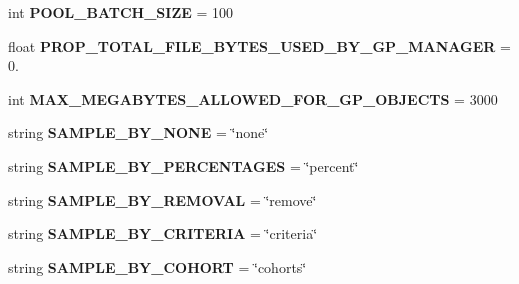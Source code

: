 \begin{DoxyCompactItemize}
\item 
int {\bfseries P\+O\+O\+L\+\_\+\+B\+A\+T\+C\+H\+\_\+\+S\+I\+ZE} = 100\hypertarget{namespacenegui_1_1pgdriveneestimator_aadadcf84aaf075e62f2a0720ef29ea11}{}\label{namespacenegui_1_1pgdriveneestimator_aadadcf84aaf075e62f2a0720ef29ea11}

\item 
float {\bfseries P\+R\+O\+P\+\_\+\+T\+O\+T\+A\+L\+\_\+\+F\+I\+L\+E\+\_\+\+B\+Y\+T\+E\+S\+\_\+\+U\+S\+E\+D\+\_\+\+B\+Y\+\_\+\+G\+P\+\_\+\+M\+A\+N\+A\+G\+ER} = 0.\hypertarget{namespacenegui_1_1pgdriveneestimator_a89e1e433a1e13de143a0ba9eb5f67c4e}{}\label{namespacenegui_1_1pgdriveneestimator_a89e1e433a1e13de143a0ba9eb5f67c4e}

\item 
int {\bfseries M\+A\+X\+\_\+\+M\+E\+G\+A\+B\+Y\+T\+E\+S\+\_\+\+A\+L\+L\+O\+W\+E\+D\+\_\+\+F\+O\+R\+\_\+\+G\+P\+\_\+\+O\+B\+J\+E\+C\+TS} = 3000\hypertarget{namespacenegui_1_1pgdriveneestimator_ad3cf3c0a3d4e6985fa514fd4a5f31462}{}\label{namespacenegui_1_1pgdriveneestimator_ad3cf3c0a3d4e6985fa514fd4a5f31462}

\item 
string {\bfseries S\+A\+M\+P\+L\+E\+\_\+\+B\+Y\+\_\+\+N\+O\+NE} = \char`\"{}none\char`\"{}\hypertarget{namespacenegui_1_1pgdriveneestimator_a4907a8a6c190c39d4a349740c1ba54e5}{}\label{namespacenegui_1_1pgdriveneestimator_a4907a8a6c190c39d4a349740c1ba54e5}

\item 
string {\bfseries S\+A\+M\+P\+L\+E\+\_\+\+B\+Y\+\_\+\+P\+E\+R\+C\+E\+N\+T\+A\+G\+ES} = \char`\"{}percent\char`\"{}\hypertarget{namespacenegui_1_1pgdriveneestimator_ad560d78f911e3ffb994db493a2ab89b2}{}\label{namespacenegui_1_1pgdriveneestimator_ad560d78f911e3ffb994db493a2ab89b2}

\item 
string {\bfseries S\+A\+M\+P\+L\+E\+\_\+\+B\+Y\+\_\+\+R\+E\+M\+O\+V\+AL} = \char`\"{}remove\char`\"{}\hypertarget{namespacenegui_1_1pgdriveneestimator_a3fa91319aa849a007dd7cfd4e22213f9}{}\label{namespacenegui_1_1pgdriveneestimator_a3fa91319aa849a007dd7cfd4e22213f9}

\item 
string {\bfseries S\+A\+M\+P\+L\+E\+\_\+\+B\+Y\+\_\+\+C\+R\+I\+T\+E\+R\+IA} = \char`\"{}criteria\char`\"{}\hypertarget{namespacenegui_1_1pgdriveneestimator_a3732dae3a6f631c08a94fd98ca308e84}{}\label{namespacenegui_1_1pgdriveneestimator_a3732dae3a6f631c08a94fd98ca308e84}

\item 
string {\bfseries S\+A\+M\+P\+L\+E\+\_\+\+B\+Y\+\_\+\+C\+O\+H\+O\+RT} = \char`\"{}cohorts\char`\"{}\hypertarget{namespacenegui_1_1pgdriveneestimator_ab5cd7cf71765d0fd1ace691d10631239}{}\label{namespacenegui_1_1pgdriveneestimator_ab5cd7cf71765d0fd1ace691d10631239}


\end{DoxyCompactItemize}
